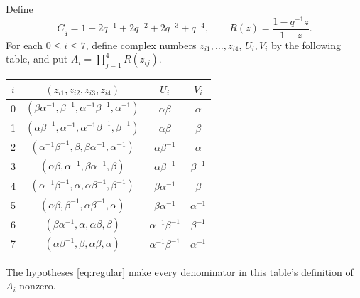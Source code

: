 \documentclass[11pt,a4paper]{article}
\begin{document}
Define 
\begin{equation}\label{eq:C}
 C_q=1+2q^{-1}+2q^{-2}+2q^{-3}+q^{-4},\qquad
 R(z)=\frac{1-q^{-1}z}{1-z}.
\end{equation}
For each $0\le i\le7$, define complex numbers  $z_{i1},\ldots,z_{i4}$, $U_i,V_i$
by the following table, and put $A_i=\prod_{j=1}^{4}R(z_{ij})$.
\begin{center}
\renewcommand{\arraystretch}{1.32}
\begin{tabular}{@{}c c c c@{}}
\toprule
$i$ & $(z_{i1},z_{i2},z_{i3},z_{i4})$ & $U_i$ & $V_i$\\
\midrule
0 & $(\beta\alpha^{-1},\beta^{-1},\alpha^{-1}\beta^{-1},\alpha^{-1})$ & $\alpha\beta$ & $\alpha$\\
1 & $(\alpha\beta^{-1},\alpha^{-1},\alpha^{-1}\beta^{-1},\beta^{-1})$ & $\alpha\beta$ & $\beta$\\
2 & $(\alpha^{-1}\beta^{-1},\beta,\beta\alpha^{-1},\alpha^{-1})$ & $\alpha\beta^{-1}$ & $\alpha$\\
3 & $(\alpha\beta,\alpha^{-1},\beta\alpha^{-1},\beta)$ & $\alpha\beta^{-1}$ & $\beta^{-1}$\\
4 & $(\alpha^{-1}\beta^{-1},\alpha,\alpha\beta^{-1},\beta^{-1})$ & $\beta\alpha^{-1}$ & $\beta$\\
5 & $(\alpha\beta,\beta^{-1},\alpha\beta^{-1},\alpha)$ & $\beta\alpha^{-1}$ & $\alpha^{-1}$\\
6 & $(\beta\alpha^{-1},\alpha,\alpha\beta,\beta)$ & $\alpha^{-1}\beta^{-1}$ & $\beta^{-1}$\\
7 & $(\alpha\beta^{-1},\beta,\alpha\beta,\alpha)$ & $\alpha^{-1}\beta^{-1}$ & $\alpha^{-1}$\\
\bottomrule
\end{tabular}
\end{center}
The hypotheses \eqref{eq:regular} make every denominator in this table's
definition of $A_i$ nonzero.
\end{document}
